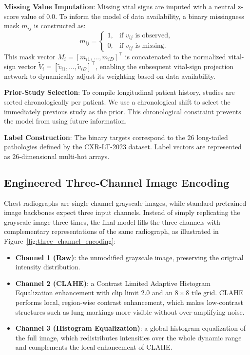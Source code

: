 \textbf{Missing Value Imputation}: Missing vital signs are imputed with a neutral z-score value of \(0.0\). To inform the model of data availability, a binary missingness mask \(m_{ij}\) is constructed as:
\begin{equation}
    m_{ij} =
    \begin{cases}
        1, & \text{if } v_{ij} \text{ is observed}, \\
        0, & \text{if } v_{ij} \text{ is missing}.
    \end{cases}
\end{equation}
This mask vector \(M_i = [m_{i1}, \dots, m_{iD}]^\top\) is concatenated to the normalized vital-sign vector \(\tilde{V}_i = [\tilde{v}_{i1}, \dots, \tilde{v}_{iD}]^\top\), enabling the subsequent vital-sign projection network to dynamically adjust its weighting based on data availability.

\textbf{Prior-Study Selection}: To compile longitudinal patient history, studies are sorted chronologically per patient. We use a chronological shift to select the immediately previous study as the prior. This chronological constraint prevents the model from using future information.

\textbf{Label Construction}: The binary targets correspond to the $26$ long-tailed pathologies defined by the CXR-LT-2023 dataset. Label vectors are represented as $26$-dimensional multi-hot arrays.

\subsection{Engineered Three-Channel Image Encoding}
\label{subsec:method_three_channel}

Chest radiographs are single-channel grayscale images, while standard pretrained image backbones expect three input channels. Instead of simply replicating the grayscale image three times, the final model fills the three channels with complementary representations of the same radiograph, as illustrated in Figure~\ref{fig:three_channel_encoding}:

\begin{itemize}
    \item \textbf{Channel 1 (Raw)}: the unmodified grayscale image, preserving the original intensity distribution.
    \item \textbf{Channel 2 (CLAHE)}: a Contrast Limited Adaptive Histogram Equalization enhancement \cite{zuiderveld1994clahe} with clip limit $2.0$ and an $8 \times 8$ tile grid. CLAHE performs local, region-wise contrast enhancement, which makes low-contrast structures such as lung markings more visible without over-amplifying noise.
    \item \textbf{Channel 3 (Histogram Equalization)}: a global histogram equalization of the full image, which redistributes intensities over the whole dynamic range and complements the local enhancement of CLAHE.
\end{itemize}

